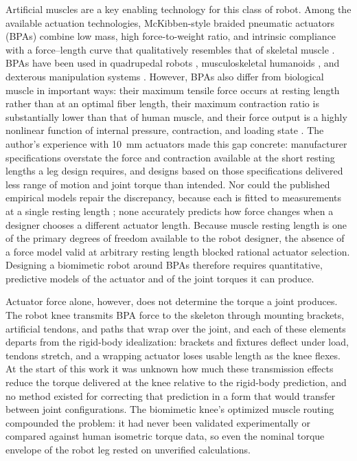 Artificial muscles are a key enabling technology for this class of robot. Among the available actuation technologies, McKibben-style braided pneumatic actuators (BPAs) combine low mass, high force-to-weight ratio, and intrinsic compliance with a force--length curve that qualitatively resembles that of skeletal muscle \citep{liang_comparative_2020, hunt_modeling_2017}. BPAs have been used in quadrupedal robots \citep{aschenbeck_design_2006, hunt_modeling_2017, scharzenberger_design_2019}, musculoskeletal humanoids \citep{asano_design_2017, hitzmann_anthropomorphic_2018}, and dexterous manipulation systems \citep{chen_realizing_2019}. However, BPAs also differ from biological muscle in important ways: their maximum tensile force occurs at resting length rather than at an optimal fiber length, their maximum contraction ratio is substantially lower than that of human muscle, and their force output is a highly nonlinear function of internal pressure, contraction, and loading state \citep{hunt_modeling_2017, sarosi_comparative_2017, liang_comparative_2020}. The author's experience with \qty{10}{\mm} actuators made this gap concrete: manufacturer specifications overstate the force and contraction available at the short resting lengths a leg design requires, and designs based on those specifications delivered less range of motion and joint torque than intended. Nor could the published empirical models repair the discrepancy, because each is fitted to measurements at a single resting length \citep{sarosi_comparative_2017, martens_modeling_2017, hunt_modeling_2017}; none accurately predicts how force changes when a designer chooses a different actuator length. Because muscle resting length is one of the primary degrees of freedom available to the robot designer, the absence of a force model valid at arbitrary resting length blocked rational actuator selection. Designing a biomimetic robot around BPAs therefore requires quantitative, predictive models of the actuator and of the joint torques it can produce.

Actuator force alone, however, does not determine the torque a joint produces. The robot knee transmits BPA force to the skeleton through mounting brackets, artificial tendons, and paths that wrap over the joint, and each of these elements departs from the rigid-body idealization: brackets and fixtures deflect under load, tendons stretch, and a wrapping actuator loses usable length as the knee flexes. At the start of this work it was unknown how much these transmission effects reduce the torque delivered at the knee relative to the rigid-body prediction, and no method existed for correcting that prediction in a form that would transfer between joint configurations. The biomimetic knee's optimized muscle routing \citep{morrow_optimization_2020} compounded the problem: it had never been validated experimentally or compared against human isometric torque data, so even the nominal torque envelope of the robot leg rested on unverified calculations.

